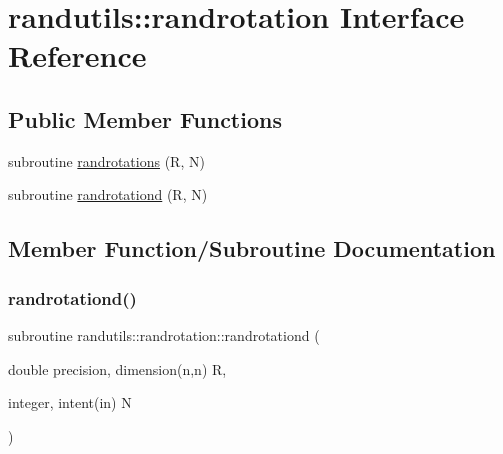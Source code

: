 \hypertarget{interfacerandutils_1_1randrotation}{}\section{randutils\+:\+:randrotation Interface Reference}
\label{interfacerandutils_1_1randrotation}
\subsection*{Public Member Functions}
\begin{DoxyCompactItemize}
\item 
subroutine \mbox{\hyperlink{interfacerandutils_1_1randrotation_ae46ae1a1729e9f310b9f3e7ac30fe507}{randrotations}} (R, N)
\item 
subroutine \mbox{\hyperlink{interfacerandutils_1_1randrotation_a4b6ffb7d782c13ccb55bc2ae7eae528b}{randrotationd}} (R, N)
\end{DoxyCompactItemize}


\subsection{Member Function/\+Subroutine Documentation}
\mbox{\label{interfacerandutils_1_1randrotation_a4b6ffb7d782c13ccb55bc2ae7eae528b}} 
\subsubsection{\texorpdfstring{randrotationd()}{randrotationd()}}
{\footnotesize\ttfamily subroutine randutils\+::randrotation\+::randrotationd (\begin{DoxyParamCaption}\item[{double precision, dimension(n,n)}]{R,  }\item[{integer, intent(in)}]{N }\end{DoxyParamCaption})}

\mbox{\label{interfacerandutils_1_1randrotation_ae46ae1a1729e9f310b9f3e7ac30fe507}} 
